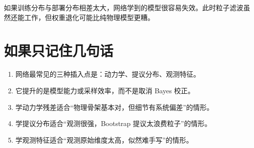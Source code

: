 \documentclass[12pt,a4paper]{ctexart}
\begin{document}
如果训练分布与部署分布相差太大，网络学到的模型很容易失效。此时粒子滤波虽然还能工作，但权重退化可能比纯物理模型更糟。

\section{如果只记住几句话}

\begin{enumerate}
  \item 网络最常见的三种插入点是：动力学、提议分布、观测特征。
  \item 它提升的是模型能力或采样效率，而不是取消 Bayes 校正。
  \item 学动力学残差适合“物理骨架基本对，但细节有系统偏差”的情形。
  \item 学提议分布适合“观测很强，Bootstrap 提议太浪费粒子”的情形。
  \item 学观测特征适合“观测原始维度太高，似然难手写”的情形。
\end{enumerate}
\end{document}
